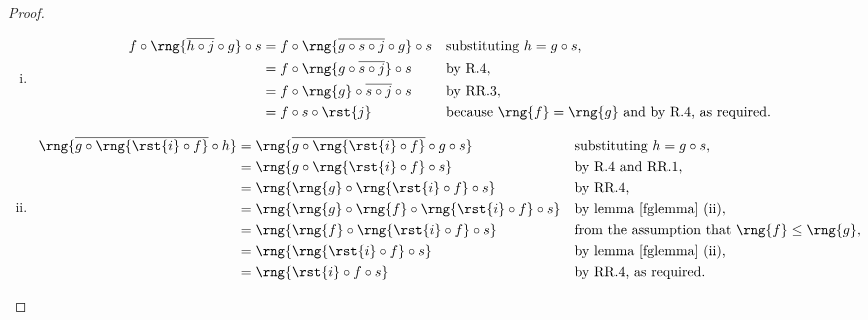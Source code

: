 \begin{proof}
\begin{enumerate}[(i)]
\item

\begin{align*}
f \circ \rng{\overline{h \circ j} \circ g} \circ s
   &= f \circ \rng{\overline{g \circ s \circ j} \circ g} \circ s
                     &&\mbox{substituting $h=g \circ s$, } \\
   &= f \circ \rng{g \circ  \overline{s \circ j} } \circ s
                     && \mbox{by R.4}, \\
   &= f \circ \rng{g} \circ  \overline{s \circ j}  \circ s 
                     && \mbox{by RR.3}, \\
   &= f \circ s \circ \rst{j}
                     && \mbox{because $\rng{f} = \rng{g}$ and by R.4, as required.} 
\end{align*}
\item

\begin{align*}
\rng{\overline{g \circ \rng{\rst{i} \circ f}}\circ h}
     &= \rng{\overline{g \circ \rng{\rst{i} \circ f}}\circ g \circ s}
     && \mbox{substituting $h=g \circ s$,} \\ 
     &= \rng{g \circ \rng{\rst{i} \circ f}\circ s}
     && \mbox{by R.4 and RR.1,} \\ 
     &= \rng{\rng{g} \circ \rng{\rst{i} \circ f}\circ s}
     && \mbox{by RR.4,} \\ 
     &= \rng{\rng{g} \circ \rng{f} \circ \rng{\rst{i} \circ f}\circ s}
     && \mbox{by lemma \ref{fglemma} (ii),} \\ 
     &= \rng{\rng{f} \circ \rng{\rst{i} \circ f}\circ s}
     && \mbox{from the assumption that $\rng{f} \leq \rng{g}$,}\\
     &= \rng{\rng{\rst{i} \circ f}\circ s}
     && \mbox{by lemma \ref{fglemma} (ii),} \\ 
     &= \rng{\rst{i} \circ f \circ s}
     && \mbox{by RR.4, as required.}   
\end{align*}
\end{enumerate}
\end{proof}
